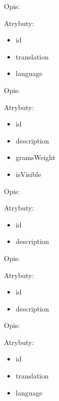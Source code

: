 \begin{enumerate}[label={\textbf{KAT/\protect\threedigits{\theenumi}}}, wide, labelwidth=!, labelindent=0pt, series=reqs]
     \label{kat:NutritionDefinitionTranslation}

    Opis: \lipsum[1]
    \par
    Atrybuty:
    \begin{itemize}
        \item id
        \item translation
        \item language
    \end{itemize}

     \label{kat:HouseholdMeasure}

    Opis: \lipsum[1]
    \par
    Atrybuty:
    \begin{itemize}
        \item id
        \item description
        \item gramsWeight
        \item isVisible
    \end{itemize}

     \label{kat:ProductSubcategory}

    Opis: \lipsum[1]
    \par
    Atrybuty:
    \begin{itemize}
        \item id
        \item description
    \end{itemize}

     \label{kat:ProductCategory}

    Opis: \lipsum[1]
    \par
    Atrybuty:
    \begin{itemize}
        \item id
        \item description
    \end{itemize}

     \label{kat:ProductCategoryTranslation}

    Opis: \lipsum[1]
    \par
    Atrybuty:
    \begin{itemize}
        \item id
        \item translation
        \item language
    \end{itemize}


\end{enumerate}
